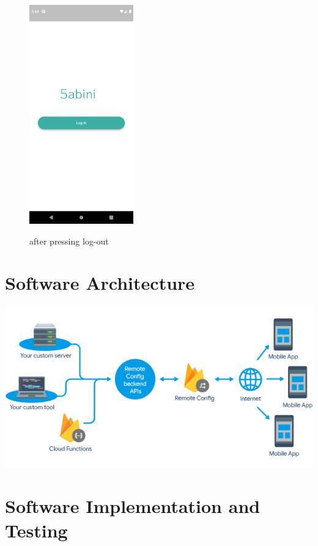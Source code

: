 \documentclass[12pt]{article}
\begin{document}
    \begin{figure}[h!]
{\includegraphics[width=0.4\textwidth]{./Screenshots/1.PNG}}
  \caption{after pressing log-out}
  \end{figure}
  
  
  \clearpage
\section{Software Architecture}
{\includegraphics[width=1.1\textwidth]{./SoftwareArch/SoftwareArch.PNG}}
\sectionbreak
  \clearpage
\section{Software Implementation and Testing}
\end{document}
